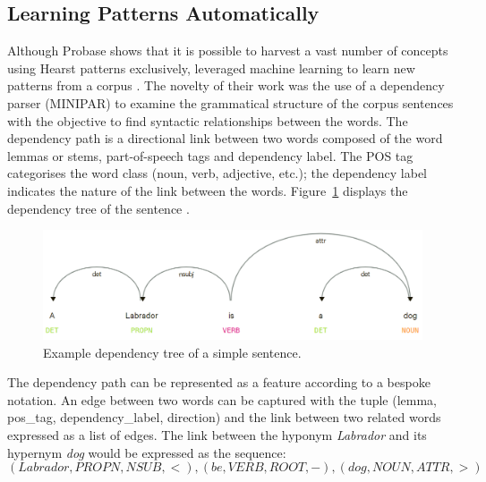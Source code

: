 \subsection{Learning Patterns Automatically} \label{Learning Patterns Automatically}
Although Probase shows that it is possible to harvest a vast number of concepts using Hearst patterns %
exclusively, \citeauthor{Snow2004} leveraged machine learning to learn new patterns from a corpus \citep{Snow2004}.  The novelty of their work was the use of a dependency parser (MINIPAR) %
to examine the grammatical structure of the corpus sentences with the objective to find syntactic relationships between the words.  The dependency path is a directional link between two words composed of the word lemmas or stems, part-of-speech tags and dependency label.  The \ac{POS} tag categorises the word class (noun, verb, adjective, etc.); the dependency label indicates the nature of the link between the words.  Figure~\ref{fig:simple_dep_tree} displays%
the dependency tree of the sentence .
\begin{figure}[ht!] %
  \centering
  \includegraphics[width=1.\linewidth]{images/dependency_parse.png}
  \caption{Example dependency tree of a simple sentence.}%
  \label{fig:simple_dep_tree}
\end{figure}


The dependency path can be represented as a feature according to a bespoke notation.  An edge between two words can be captured with the tuple (lemma, pos\_tag, dependency\_label, direction) and the link between two related words expressed as a list of edges.  The link between the hyponym \textit{Labrador} and its hypernym \textit{dog} would be expressed as the sequence:
\[(Labrador, PROPN, NSUB, <), (be, VERB, ROOT, -),(dog, NOUN, ATTR, >)\]

